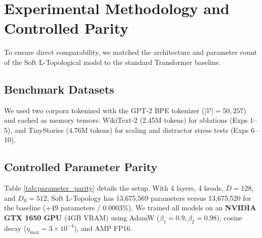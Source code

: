 \label{chap:ablations}

\section{Experimental Methodology and Controlled Parity}
To ensure direct comparability, we matched the architecture and parameter count of the Soft L-Topological model to the standard Transformer baseline.

\begin{table}[!htbp]
\centering
\caption{Architectural Specifications and Parameter Parity Comparison}
\label{tab:parameter_parity}
\small
\renewcommand{\arraystretch}{0.95}
\setlength{\tabcolsep}{6pt}
\end{table}

\subsection{Benchmark Datasets}
We used two corpora tokenized with the GPT-2 BPE tokenizer ($|\mathcal{V}| = 50,257$) \cite{radford2019language} and cached as memory tensors: WikiText-2 (2.45M tokens) \cite{merity2016pointer} for ablations (Exps 1--5), and TinyStories (4.76M tokens) \cite{eldan2023tinystories} for scaling and distractor stress tests (Exps 6--10).

\subsection{Controlled Parameter Parity}
Table \ref{tab:parameter_parity} details the setup. With 4 layers, 4 heads, $D=128$, and $D_{\text{ff}}=512$, Soft L-Topology has 13,675,569 parameters versus 13,675,520 for the baseline (+49 parameters / 0.0003\%). We trained all models on an \textbf{NVIDIA GTX 1650 GPU} (4GB VRAM) using AdamW ($\beta_1=0.9, \beta_2=0.98$), cosine decay ($\eta_{\max} = 3 \times 10^{-4}$), and AMP FP16.

